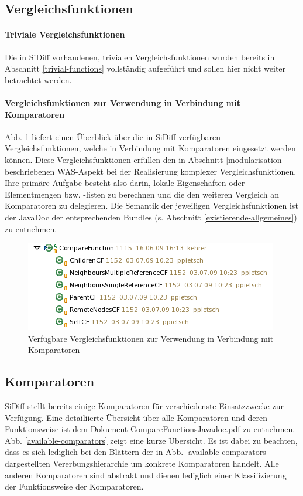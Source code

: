 \documentclass[10pt,a4paper]{scrartcl}
\begin{document}
\subsection{Vergleichsfunktionen}
\label{existing-functions}

\paragraph{Triviale Vergleichsfunktionen}
Die in SiDiff vorhandenen, trivialen Vergleichsfunktionen wurden bereits in Abschnitt 
\ref{trivial-functions} vollständig aufgeführt und sollen hier nicht weiter betrachtet werden.


\paragraph{Vergleichsfunktionen zur Verwendung in Verbindung mit Komparatoren}
Abb. \ref{available-compare-functions} liefert einen Überblick über die in SiDiff verfügbaren 
Vergleichsfunktionen, welche in Verbindung mit Komparatoren eingesetzt werden können. 
Diese Vergleichsfunktionen erfüllen den
in Abschnitt \ref{modularisation} beschriebenen WAS-Aspekt bei der Realisierung komplexer Vergleichsfunktionen.
Ihre primäre Aufgabe besteht also darin, lokale Eigenschaften oder Elementmengen bzw. -listen
zu berechnen und die den weiteren Vergleich an Komparatoren zu delegieren.
Die Semantik der jeweiligen Vergleichsfunktionen ist der JavaDoc der entsprechenden Bundles 
(s. Abschnitt \ref{existierende-allgemeines}) zu entnehmen.

\begin{figure}[htb]
	\begin{center}
 		\includegraphics[scale=1.0]{pics/available-compare-functions.png}
	\end{center}
	\caption{Verfügbare Vergleichsfunktionen zur Verwendung in Verbindung mit Komparatoren}
	\label{available-compare-functions}
\end{figure} 


\subsection{Komparatoren}
SiDiff stellt bereits einige Komparatoren für verschiedenste Einsatzzwecke zur Verfügung. Eine
detailiierte Übersicht über alle Komparatoren und deren Funktionsweise ist dem
Dokument CompareFunctionsJavadoc.pdf zu entnehmen. Abb.
\ref{available-comparators} zeigt eine kurze Übersicht. Es ist dabei zu
beachten, dass es sich lediglich bei den Blättern der in Abb.
\ref{available-comparators} dargestellten Vererbungshierarchie um konkrete
Komparatoren handelt. Alle anderen Komparatoren sind abstrakt und dienen
lediglich einer Klassifizierung der Funktionsweise der Komparatoren.
\end{document}
